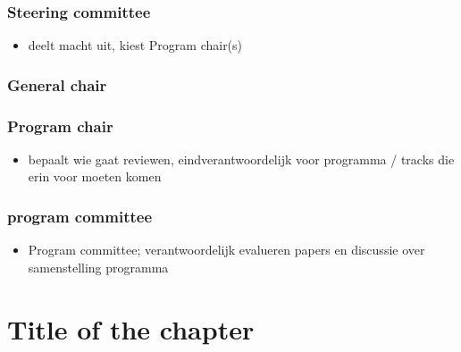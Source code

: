 \subsection{Steering committee}
\begin{itemize}
    \item deelt macht uit, kiest Program chair(s)
\end{itemize}
\subsection{General chair}
\subsection{Program chair}
\begin{itemize}
    \item bepaalt wie gaat reviewen, eindverantwoordelijk voor programma / tracks die erin voor moeten komen
\end{itemize}
\subsection{program committee}
\begin{itemize}
    \item Program committee; verantwoordelijk evalueren papers en discussie over samenstelling programma
\end{itemize}

\chapter{Title of the chapter}

